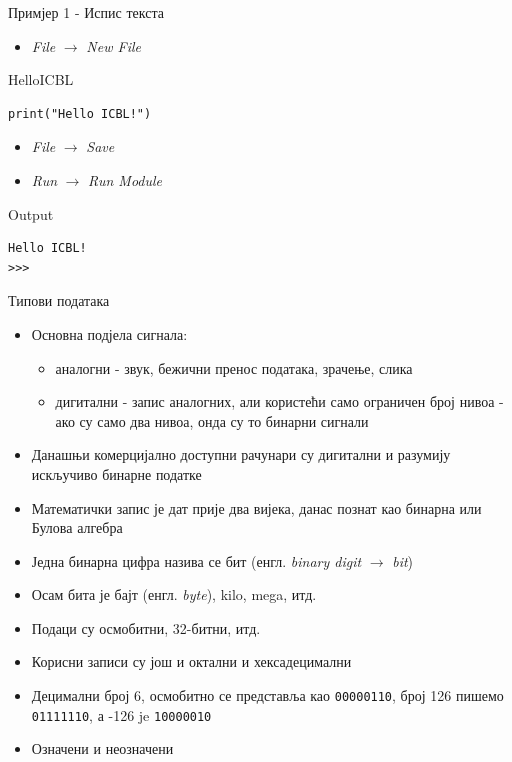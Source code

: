 \documentclass{beamer}
\begin{document}
\begin{frame}[fragile]{Примјер 1 - Испис текста}

\begin{itemize}
\item \textit{File} $\rightarrow$ \textit{New File}
\end{itemize}

\begin{block}{HelloICBL}
\begin{lstlisting}
print("Hello ICBL!")
\end{lstlisting}
\end{block}

\begin{itemize}
\item \textit{File} $\rightarrow$ \textit{Save}
\item \textit{Run} $\rightarrow$ \textit{Run Module}
\end{itemize}

\begin{block}{Output}
\begin{lstlisting}
Hello ICBL!
>>> 
\end{lstlisting}
\end{block}

\end{frame}

\begin{frame}{Типови података}
\begin{itemize}
    \item Основна подјела сигнала:
    \begin{itemize}
        \item аналогни - звук, бежични пренос података, зрачење, слика
        \item дигитални - запис аналогних, али користећи само ограничен број нивоа - ако су само два нивоа, онда су то бинарни сигнали
    \end{itemize}
    \item Данашњи комерцијално доступни рачунари су дигитални и разумију искључиво бинарне податке
    \item Математички запис је дат прије два вијека, данас познат као бинарна или Булова алгебра
    \item Једна бинарна цифра назива се бит (енгл. \textit{binary digit} $\rightarrow$ \textit{bit})
    \item Осам бита је бајт (енгл. \textit{byte}), kilo, mega, итд.
    \item Подаци су осмобитни, 32-битни, итд.
    \item Корисни записи су још и октални и хексадецимални
    \item Децимални број 6, осмобитно се представља као \texttt{00000110}, број 126 пишемо \texttt{01111110}, а -126 je \texttt{10000010}
    \item Означени и неозначени
\end{itemize}
\end{frame}
\end{document}
